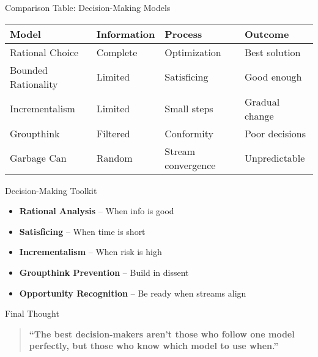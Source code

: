 \documentclass[10pt]{beamer}
\begin{document}
\begin{frame}{Comparison Table: Decision-Making Models}
\begin{tabularx}{\textwidth}{l X X X}
\toprule
\textbf{Model} & \textbf{Information} & \textbf{Process} & \textbf{Outcome} \\
\midrule
Rational Choice & Complete & Optimization & Best solution \\
Bounded Rationality & Limited & Satisficing & Good enough \\
Incrementalism & Limited & Small steps & Gradual change \\
Groupthink & Filtered & Conformity & Poor decisions \\
Garbage Can & Random & Stream convergence & Unpredictable \\
\bottomrule
\end{tabularx}
\end{frame}

\begin{frame}{Decision-Making Toolkit}
\begin{itemize}
  \item \textbf{Rational Analysis} -- When info is good
  \item \textbf{Satisficing} -- When time is short
  \item \textbf{Incrementalism} -- When risk is high
  \item \textbf{Groupthink Prevention} -- Build in dissent
  \item \textbf{Opportunity Recognition} -- Be ready when streams align
\end{itemize}
\end{frame}

\begin{frame}{Final Thought}
\begin{quote}
\textbf{``The best decision-makers aren't those who follow one model perfectly, but those who know which model to use when.''}
\end{quote}
\end{frame}
\end{document}
